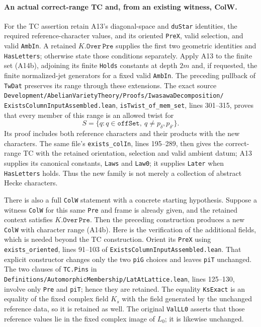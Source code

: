 \paragraph{An actual correct-range TC and, from an existing witness, ColW.}
For the TC assertion retain A13's diagonal-space and
\texttt{duStar} identities, the required reference-character values,
and its oriented \texttt{PreX}, valid selection, and valid
\texttt{AmbIn}.  A retained $K.\texttt{Over}\,\texttt{Pre}$
supplies the first two geometric identities and
\texttt{HasLetters}; otherwise state those conditions separately.
Apply A13 to the finite set (A14b), adjoining its finite
\texttt{Holds} constants at depth $2m$ and, if requested, the finite
normalized-jet generators for a fixed valid \texttt{AmbIn}.
The preceding pullback of \texttt{TwDat} preserves its range through
these extensions.  The exact source
\texttt{Development/AbelianVarietyTheory/Proofs/IwasawaDecomposition/}
\texttt{ExistsColumnInputAssembled.lean},
\texttt{isTwist\_of\_mem\_set}, lines 301--315, proves that every
member of this range is an allowed twist for
\[
 S=\{q:q\in\texttt{offSet},\ q\ne p_\delta,p_{\delta'}\}.
\]
Its proof includes both reference characters and their products with
the new characters.  The same file's
\texttt{exists\_colIn}, lines 195--289, then gives the correct-range
TC with the retained orientation, selection and valid ambient datum;
A13 supplies its canonical constants, \texttt{Laws} and
\texttt{Law0}; it supplies \texttt{Later} when
\texttt{HasLetters} holds.  Thus the new family is not merely
a collection of abstract Hecke characters.

There is also a full \texttt{ColW} statement with a concrete starting
hypothesis.  Suppose a witness \texttt{ColW} for this same
\texttt{Pre} and frame is already given, and the retained context
satisfies $K.\texttt{Over}\,\texttt{Pre}$.  Then the preceding construction
produces a new \texttt{ColW} with character range (A14b).
Here is the verification of the additional fields, which is needed
beyond the TC construction.  Orient its \texttt{PreX} using
\texttt{exists\_oriented}, lines 91--103 of
\texttt{ExistsColumnInputAssembled.lean}.  That explicit constructor
changes only the two \texttt{piG} choices and leaves
\texttt{piT} unchanged.  The two clauses of \texttt{TC.Pins}
in \texttt{Definitions/AutomorphicMembership/LatAtLattice.lean},
lines 125--130, involve only \texttt{Pre} and \texttt{piT}; hence they
are retained.  The equality \texttt{KsExact} is an equality of the
fixed complex field $K_s$ with the field generated by the unchanged
reference data, so it is retained as well.  The original
\texttt{ValLL0} asserts that those reference values lie in the fixed
complex image of $L_0$; it is likewise unchanged.

